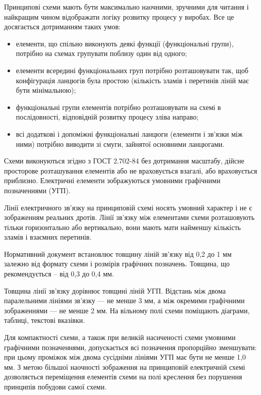 Принципові схеми мають бути максимально наочними, зручними для читання і найкращим чином відображати логіку розвитку процесу у виробах. Все це досягається дотриманням таких умов:

\begin{itemize}
\item елементи, що спільно виконують деякі функції (функціональні групи), потрібно на схемах групувати поблизу один від одного;
\item елементи всередині функціональних груп потрібно розташовувати так, щоб конфігурація ланцюгів була простою (кількість зламів і перетинів ліній має бути мінімальною);
\item функціональні групи елементів потрібно розташовувати на схемі в послідовності, відповідній розвитку процесу зліва направо;
\item всі додаткові і допоміжні функціональні ланцюги (елементи і зв’язки між ними) потрібно виводити зі смуги, зайнятої основними ланцюгами.
\end{itemize}

Схеми виконуються згідно з ГОСТ 2.702-84 без дотримання масштабу, дійсне просторове розташування елементів або не враховується взагалі, або враховується приблизно. Електричні елементи зображуються умовними графічними позначеннями (УГП).

Лінії електричного зв’язку на принциповій схемі носять умовний характер і не є зображенням реальних дротів. Лінії зв’язку між елементами схеми розташовують тільки горизонтально або вертикально, вони мають мати найменшу кількість зламів і взаємних перетинів.

Нормативний документ встановлює товщину ліній зв’язку від 0,2 до 1 мм залежно від формату схеми і розмірів графічних позначень. Товщина, що рекомендується -- від 0,3 до 0,4 мм.

Товщина лінії зв’язку дорівнює товщині ліній УГП. Відстань між двома паралельними лініями зв’язку — не менше 3 мм, а між окремими графічними зображеннями — не менше 2 мм.
На вільному полі схеми поміщають діаграми, таблиці, текстові вказівки.

Для компактності схеми, а також при великій насиченості схеми умовними графічними позначеннями, допускається всі позначення пропорційно зменшувати: при цьому проміжок між двома сусідніми лініями УГП має бути не менше 1,0 мм. З метою більшої наочності зображення на принциповій електричній схемі дозволяється переміщення елементів схеми на полі креслення без порушення принципів побудови самої схеми.

